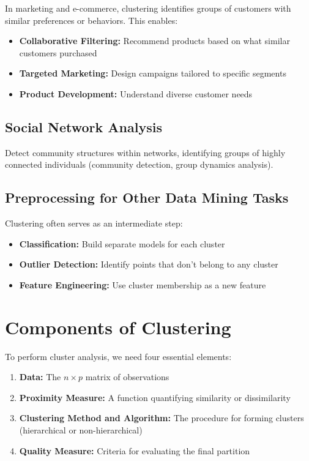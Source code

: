 \documentclass[11pt]{article}
\begin{document}
In marketing and e-commerce, clustering identifies groups of customers with similar preferences or behaviors. This enables:
\begin{itemize}
    \item \textbf{Collaborative Filtering:} Recommend products based on what similar customers purchased
    \item \textbf{Targeted Marketing:} Design campaigns tailored to specific segments
    \item \textbf{Product Development:} Understand diverse customer needs
\end{itemize}

\subsection{Social Network Analysis}

Detect community structures within networks, identifying groups of highly connected individuals (community detection, group dynamics analysis).

\subsection{Preprocessing for Other Data Mining Tasks}

Clustering often serves as an intermediate step:
\begin{itemize}
    \item \textbf{Classification:} Build separate models for each cluster
    \item \textbf{Outlier Detection:} Identify points that don't belong to any cluster
    \item \textbf{Feature Engineering:} Use cluster membership as a new feature
\end{itemize}

\section{Components of Clustering}

To perform cluster analysis, we need four essential elements:

\begin{enumerate}
    \item \textbf{Data:} The $n \times p$ matrix of observations
    \item \textbf{Proximity Measure:} A function quantifying similarity or dissimilarity
    \item \textbf{Clustering Method and Algorithm:} The procedure for forming clusters (hierarchical or non-hierarchical)
    \item \textbf{Quality Measure:} Criteria for evaluating the final partition
\end{enumerate}
\end{document}
